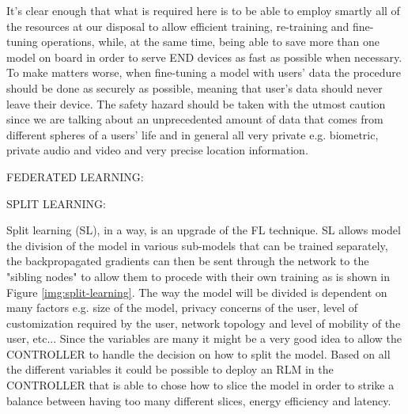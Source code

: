 It's clear enough that what is required here is to be able to employ smartly all of the resources at
our disposal to allow efficient training, re-training and fine-tuning operations, while, at the same
time, being able to save more than one model on board in order to serve END devices as fast as
possible when necessary. To make matters worse, when fine-tuning a model with users' data the
procedure should be done as securely as possible, meaning that user's data should never leave their
device. The safety hazard should be taken with the utmost caution since we are talking about an
unprecedented amount of data that comes from different spheres of a users' life and in general all
very private e.g. biometric, private audio and video and very precise location information.

\bigskip
\noindent
FEDERATED LEARNING:


\bigskip
\noindent
SPLIT LEARNING:

Split learning (SL), in a way, is an upgrade of the FL technique.
SL allows model the division of the model in various sub-models that can be trained separately, the
backpropagated gradients can then be sent through the network to the "sibling nodes" to allow them
to procede with their own training as is shown in Figure \ref{img:split-learning}.
The way the model will be divided is dependent on many factors e.g. size of the
model, privacy concerns of the user, level of customization required by the user, network topology
and level of mobility of the user, etc...
Since the variables are many it might be a very good idea to allow the CONTROLLER to handle the
decision on how to split the model. Based on all the different variables it could be possible to
deploy an RLM in the CONTROLLER that is able to chose how to slice the model in order to strike a
balance between having too many different slices, energy efficiency and latency.

